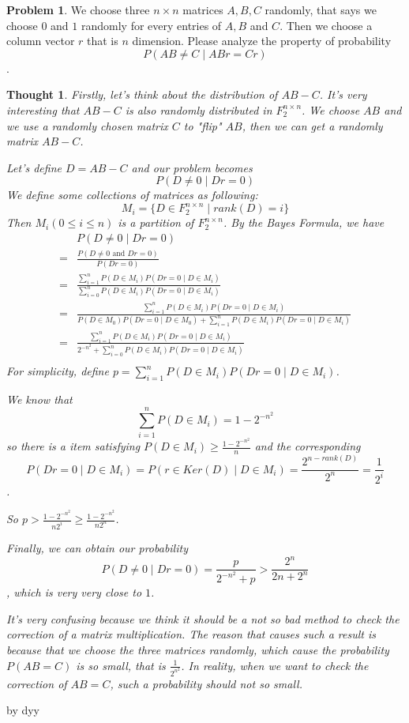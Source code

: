 \documentclass[12pt]{article}
\newtheorem{thought}{Thought}
\theoremstyle{definition}
\newtheorem{hw}{Problem}
\begin{document}
	
	\bigskip
	
	\begin{hw}
		We choose three $n \times n$ matrices $A, B, C$ randomly, that says we choose $0$ and $1$ randomly for every entries of $A, B$ and $C$. Then we choose a column vector $r$ that is $n$ dimension. Please analyze the property of probability 
		$$P(AB \neq C \mid ABr = Cr)$$.
	\end{hw}
	
	\begin{thought}
		Firstly, let's think about the distribution of $AB-C$. It's very interesting that $AB-C$ is also randomly distributed in $F_2^{n\times n}$. We choose $AB$ and we use a randomly chosen matrix $C$ to "flip" $AB$, then we can get a randomly matrix $AB-C$.
		
		Let's define $D = AB-C$ and our problem becomes 
		$$
			P(D \neq 0 \mid Dr = 0)
		$$
		We define some collections of matrices as following:
		$$
			M_i = \{D\in F_2^{n\times n} \mid rank(D) = i \}
		$$
		Then $M_i(0 \leq i \leq n)$ is a partition of $F_2^{n\times n}$. By the Bayes Formula, we have
		\[
		\begin{split}
			  & P(D \neq 0 \mid Dr = 0)  \\
			= & \frac{P(D \neq 0 \text{ and } Dr = 0)}{P(Dr = 0)} \\
			= & \frac{\sum_{i = 1}^{n}P(D \in M_i)P(Dr = 0 \mid D \in M_i) }{\sum_{i = 0}^{n}P(D \in M_i)P(Dr = 0 \mid D \in M_i)} \\
			= & \frac{\sum_{i = 1}^{n}P(D \in M_i)P(Dr = 0 \mid D \in M_i) }{P(D \in M_0)P(Dr = 0 \mid D \in M_0) + \sum_{i = 1}^{n}P(D \in M_i)P(Dr = 0 \mid D \in M_i)} \\
			= & \frac{\sum_{i = 1}^{n}P(D \in M_i)P(Dr = 0 \mid D \in M_i) }{2^{-n^2}+\sum_{i = 0}^{n}P(D \in M_i)P(Dr = 0 \mid D \in M_i)} \\
		\end{split}		
		\]
		For simplicity, define $p = \sum_{i = 1}^{n}P(D \in M_i)P(Dr = 0 \mid D \in M_i)$. 
		
		We know that $$\sum_{i = 1}^{n}P(D \in M_i) = 1 - 2^{-n^2}$$ so there is a item satisfying $P(D \in M_i) \geq \frac{1 - 2^{-n^2}}{n}$ and the corresponding $$P(Dr = 0 \mid D \in M_i) = P(r \in Ker(D) \mid D \in M_i) = \frac{2^{n-rank(D)}}{2^n} = \frac{1}{2^i}$$.
		
		So $p > \frac{1-2^{-n^2}}{n2^i} \geq \frac{1-2^{-n^2}}{n2^n}$.
		
		Finally, we can obtain our probability 
		$$
			P(D \neq 0 \mid Dr = 0) = \frac{p}{2^{-n^2}+p} > \frac{2^n}{2n + 2^n} 
		$$
		, which is very very close to $1$.
		
		It's very confusing because we think it should be a not so bad method to check the correction of a matrix multiplication. The reason that causes such a result is because that we choose the three matrices randomly, which cause the probability $P(AB=C)$ is so small, that is $\frac{1}{2^{n^2}}$. In reality, when we want to check the correction of $AB=C$, such a probability should not so small. 
		
		
	\end{thought}
	
	\hfill by dyy
\end{document}
